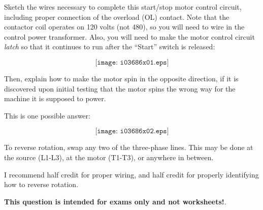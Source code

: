 

Sketch the wires necessary to complete this start/stop motor control circuit, including proper connection of the overload (OL) contact.  Note that the contactor coil operates on 120 volts (not 480), so you will need to wire in the control power transformer.  Also, you will need to make the motor control circuit {\it latch} so that it continues to run after the ``Start'' switch is released:

$$\texttt{[image: i03686x01.eps]}$$

Then, explain how to make the motor spin in the opposite direction, if it is discovered upon initial testing that the motor spins the wrong way for the machine it is supposed to power.







This is one possible answer:

$$\texttt{[image: i03686x02.eps]}$$

\vskip 10pt

To reverse rotation, swap any two of the three-phase lines.  This may be done at the source (L1-L3), at the motor (T1-T3), or anywhere in between.

\vskip 10pt

I recommend half credit for proper wiring, and half credit for properly identifying how to reverse rotation.







{\bf This question is intended for exams only and not worksheets!}.


